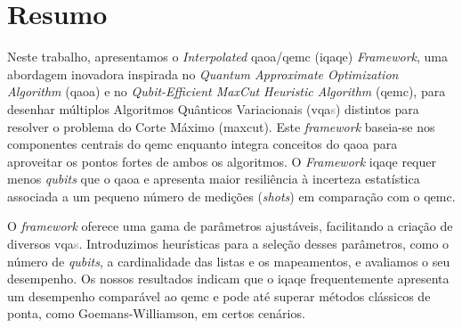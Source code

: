 
\section*{Resumo}



Neste trabalho, apresentamos o \textit{Interpolated} \acrshort{qaoa}/\acrshort{qemc} (\acrshort{iqaqe}) \textit{Framework}, uma abordagem inovadora inspirada no \textit{Quantum Approximate Optimization Algorithm} (\acrshort{qaoa}) e no \textit{Qubit-Efficient MaxCut Heuristic Algorithm} (\acrshort{qemc}), para desenhar múltiplos Algoritmos Quânticos Variacionais (\acrshort{vqa}\textcolor{gray}{s}) distintos para resolver o problema do Corte Máximo (\acrshort{maxcut}). Este \textit{framework} baseia-se nos componentes centrais do \acrshort{qemc} enquanto integra conceitos do \acrshort{qaoa} para aproveitar os pontos fortes de ambos os algoritmos. O \textit{Framework} \acrshort{iqaqe} requer menos \textit{qubits} que o \acrshort{qaoa} e apresenta maior resiliência à incerteza estatística associada a um pequeno número de medições (\textit{shots}) em comparação com o \acrshort{qemc}.

O \textit{framework} oferece uma gama de parâmetros ajustáveis, facilitando a criação de diversos \acrshort{vqa}\textcolor{gray}{s}. Introduzimos heurísticas para a seleção desses parâmetros, como o número de \textit{qubits}, a cardinalidade das listas e os mapeamentos, e avaliamos o seu desempenho. Os nossos resultados indicam que o \acrshort{iqaqe} frequentemente apresenta um desempenho comparável ao \acrshort{qemc} e pode até superar métodos clássicos de ponta, como Goemans-Williamson, em certos cenários.

